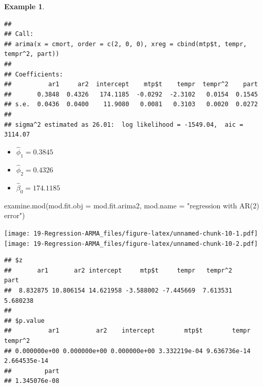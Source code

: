 \documentclass[
]{book}
\newenvironment{Shaded}{\begin{snugshade}}{\end{snugshade}}
\newcommand{\AttributeTok}[1]{\textcolor[rgb]{0.77,0.63,0.00}{#1}}
\newcommand{\DecValTok}[1]{\textcolor[rgb]{0.00,0.00,0.81}{#1}}
\newcommand{\FunctionTok}[1]{\textcolor[rgb]{0.00,0.00,0.00}{#1}}
\newcommand{\NormalTok}[1]{#1}
\newcommand{\OtherTok}[1]{\textcolor[rgb]{0.56,0.35,0.01}{#1}}
\newcommand{\SpecialCharTok}[1]{\textcolor[rgb]{0.00,0.00,0.00}{#1}}
\newcommand{\StringTok}[1]{\textcolor[rgb]{0.31,0.60,0.02}{#1}}
\theoremstyle{definition}
\theoremstyle{definition}
\newtheorem{example}{Example}[chapter]
\theoremstyle{definition}
\theoremstyle{definition}
\theoremstyle{remark}
\begin{document}
\begin{example}
\begin{Shaded}
\end{Shaded}

\begin{verbatim}
## 
## Call:
## arima(x = cmort, order = c(2, 0, 0), xreg = cbind(mtp$t, tempr, tempr^2, part))
## 
## Coefficients:
##          ar1     ar2  intercept    mtp$t    tempr  tempr^2    part
##       0.3848  0.4326   174.1185  -0.0292  -2.3102   0.0154  0.1545
## s.e.  0.0436  0.0400    11.9080   0.0081   0.3103   0.0020  0.0272
## 
## sigma^2 estimated as 26.01:  log likelihood = -1549.04,  aic = 3114.07
\end{verbatim}

\begin{itemize}
\item
  \(\hat \phi_1=0.3845\)
\item
  \(\hat \phi_2=0.4326\)
\item
  \(\hat \beta_0=174.1185\)
\end{itemize}

\begin{Shaded}
\begin{Highlighting}[]
\FunctionTok{examine.mod}\NormalTok{(}\AttributeTok{mod.fit.obj =}\NormalTok{ mod.fit.arima2, mod.name}
    \OtherTok{=} \StringTok{"regression with AR(2) error"}\NormalTok{)}
\end{Highlighting}
\end{Shaded}

\texttt{[image: 19-Regression-ARMA\_files/figure-latex/unnamed-chunk-10-1.pdf]} \texttt{[image: 19-Regression-ARMA\_files/figure-latex/unnamed-chunk-10-2.pdf]}

\begin{verbatim}
## $z
##       ar1       ar2 intercept     mtp$t     tempr   tempr^2      part 
##  8.832875 10.806154 14.621958 -3.588002 -7.445669  7.613531  5.680238 
## 
## $p.value
##          ar1          ar2    intercept        mtp$t        tempr      tempr^2 
## 0.000000e+00 0.000000e+00 0.000000e+00 3.332219e-04 9.636736e-14 2.664535e-14 
##         part 
## 1.345076e-08
\end{verbatim}


\end{example}
\end{document}
